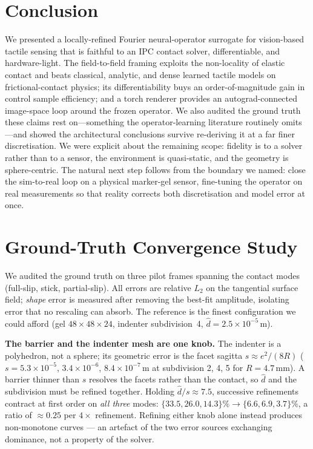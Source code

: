 \documentclass[conference]{IEEEtran}
\begin{document}
\section{Conclusion}\label{sec:conclusion}
We presented a locally-refined Fourier neural-operator surrogate for vision-based
tactile sensing that is faithful to an IPC contact solver, differentiable, and
hardware-light. The field-to-field framing
exploits the non-locality of elastic contact and beats classical, analytic, and
dense learned tactile models on frictional-contact physics; its differentiability
buys an order-of-magnitude
gain in control sample efficiency; and a torch renderer provides an
autograd-connected image-space loop around the frozen operator. We also audited the
ground truth these claims rest on---something the operator-learning literature
routinely omits---and showed the architectural conclusions survive re-deriving it
at a far finer discretisation. We were explicit about the remaining scope: fidelity
is to a solver rather than to a sensor, the environment is quasi-static, and the
geometry is sphere-centric. The natural next step follows from the boundary we
named: close the sim-to-real loop on a physical marker-gel
sensor, fine-tuning the operator on real measurements so that reality corrects both
discretisation and model error at once.

\appendices
\section{Ground-Truth Convergence Study}\label{app:conv}

We audited the ground truth on three pilot frames spanning the contact modes
(full-slip, stick, partial-slip). All errors are relative $L_2$ on the tangential
surface field; \emph{shape} error is measured after removing the best-fit
amplitude, isolating error that no rescaling can absorb. The reference is the
finest configuration we could afford (gel $48\times48\times24$, indenter
subdivision~4, $\hat d = 2.5\times10^{-5}$\,m).

\textbf{The barrier and the indenter mesh are one knob.} The indenter is a
polyhedron, not a sphere; its geometric error is the facet sagitta
$s \approx e^2/(8R)$ ($s = 5.3\times10^{-5}$, $3.4\times10^{-6}$,
$8.4\times10^{-7}$\,m at subdivision 2, 4, 5 for $R=4.7$\,mm). A barrier thinner
than $s$ resolves the facets rather than the contact, so $\hat d$ and the
subdivision must be refined together. Holding $\hat d / s \approx 7.5$, successive
refinements contract at first order on \emph{all three} modes:
$\{33.5, 26.0, 14.3\}\% \to \{6.6, 6.9, 3.7\}\%$, a ratio of $\approx 0.25$ per
$4\times$ refinement. Refining either knob alone instead produces non-monotone
curves --- an artefact of the two error sources exchanging dominance, not a
property of the solver.
\end{document}
